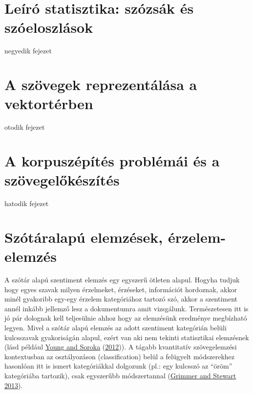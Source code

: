 \documentclass[
]{book}
\begin{document}
\hypertarget{leuxedruxf3-statisztika-szuxf3zsuxe1k-uxe9s-szuxf3eloszluxe1sok}{%
\chapter{Leíró statisztika: szózsák és
szóeloszlások}\label{leuxedruxf3-statisztika-szuxf3zsuxe1k-uxe9s-szuxf3eloszluxe1sok}}

negyedik fejezet

\hypertarget{a-szuxf6vegek-reprezentuxe1luxe1sa-a-vektortuxe9rben}{%
\chapter{A szövegek reprezentálása a
vektortérben}\label{a-szuxf6vegek-reprezentuxe1luxe1sa-a-vektortuxe9rben}}

otodik fejezet

\hypertarget{a-korpuszuxe9puxedtuxe9s-probluxe9muxe1i-uxe9s-a-szuxf6vegelux151kuxe9szuxedtuxe9s}{%
\chapter{A korpuszépítés problémái és a
szövegelőkészítés}\label{a-korpuszuxe9puxedtuxe9s-probluxe9muxe1i-uxe9s-a-szuxf6vegelux151kuxe9szuxedtuxe9s}}

hatodik fejezet

\hypertarget{szuxf3tuxe1ralapuxfa-elemzuxe9sek-uxe9rzelem-elemzuxe9s}{%
\chapter{Szótáralapú elemzések,
érzelem-elemzés}\label{szuxf3tuxe1ralapuxfa-elemzuxe9sek-uxe9rzelem-elemzuxe9s}}

A szótár alapú szentiment elemzés egy egyszerű ötleten alapul. Hogyha
tudjuk hogy egyes szavak milyen érzelmeket, érzéseket, információt
hordoznak, akkor minél gyakoribb egy-egy érzelem kategóriához tartozó
szó, akkor a szentiment annél inkább jellemző lesz a dokumentumra amit
vizsgálunk. Természetesen itt is jó pár dolognak kell teljesülnie ahhoz
hogy az elemzésünk eredménye megbízható legyen. Mivel a szótár alapú
elemzés az adott szentiment kategórián belüli kulcsszavak gyakoriságán
alapul, ezért van aki nem tekinti statisztikai elemzésnek (lásd például
\protect\hyperlink{ref-young2012affective}{Young and Soroka}
(\protect\hyperlink{ref-young2012affective}{2012})). A tágabb
kvantitatív szövegelemzési kontextusban az osztályozáson
(classification) belül a felügyelt módszerekhez hasonlóan itt is ismert
kategóriákkal dolgozunk (pl.: egy kulcsszó az ``öröm'' kategóriába
tartozik), csak egyszerűbb módszertannal
(\protect\hyperlink{ref-grimmer2013text}{Grimmer and Stewart 2013}).
\end{document}
